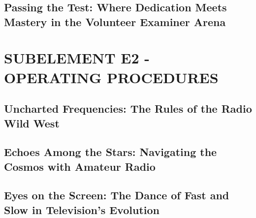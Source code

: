 \documentclass[12pt]{book}
\begin{document}
\section{Passing the Test: Where Dedication Meets Mastery in the Volunteer Examiner Arena}











\chapter{SUBELEMENT E2 - OPERATING PROCEDURES}
\section{Uncharted Frequencies: The Rules of the Radio Wild West}











\section{Echoes Among the Stars: Navigating the Cosmos with Amateur Radio}












\section{Eyes on the Screen: The Dance of Fast and Slow in Television's Evolution}












\end{document}
